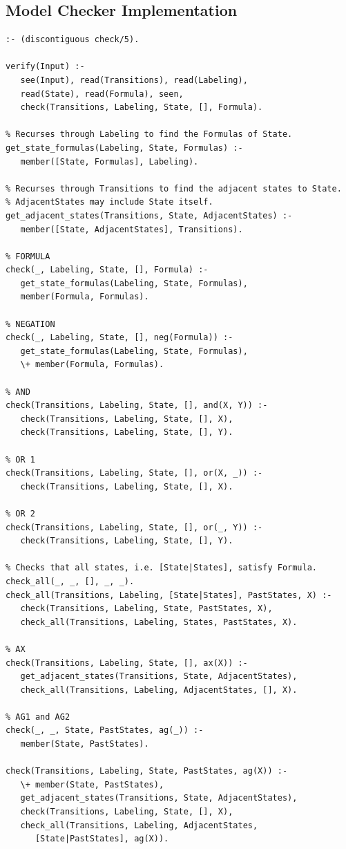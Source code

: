 \documentclass[a4paper, 11pt]{article}
\begin{document}
   \subsection{Model Checker Implementation}

\begin{lstlisting}
:- (discontiguous check/5).

verify(Input) :- 
   see(Input), read(Transitions), read(Labeling),
   read(State), read(Formula), seen,
   check(Transitions, Labeling, State, [], Formula).

% Recurses through Labeling to find the Formulas of State.
get_state_formulas(Labeling, State, Formulas) :-
   member([State, Formulas], Labeling).

% Recurses through Transitions to find the adjacent states to State. 
% AdjacentStates may include State itself.
get_adjacent_states(Transitions, State, AdjacentStates) :-
   member([State, AdjacentStates], Transitions).

% FORMULA
check(_, Labeling, State, [], Formula) :-
   get_state_formulas(Labeling, State, Formulas),
   member(Formula, Formulas).
	
% NEGATION
check(_, Labeling, State, [], neg(Formula)) :-
   get_state_formulas(Labeling, State, Formulas),
   \+ member(Formula, Formulas).
	
% AND
check(Transitions, Labeling, State, [], and(X, Y)) :-
   check(Transitions, Labeling, State, [], X),
   check(Transitions, Labeling, State, [], Y).

% OR 1
check(Transitions, Labeling, State, [], or(X, _)) :-
   check(Transitions, Labeling, State, [], X).

% OR 2
check(Transitions, Labeling, State, [], or(_, Y)) :-
   check(Transitions, Labeling, State, [], Y).

% Checks that all states, i.e. [State|States], satisfy Formula.
check_all(_, _, [], _, _).
check_all(Transitions, Labeling, [State|States], PastStates, X) :-
   check(Transitions, Labeling, State, PastStates, X),
   check_all(Transitions, Labeling, States, PastStates, X).

% AX
check(Transitions, Labeling, State, [], ax(X)) :-
   get_adjacent_states(Transitions, State, AdjacentStates),
   check_all(Transitions, Labeling, AdjacentStates, [], X).

% AG1 and AG2
check(_, _, State, PastStates, ag(_)) :-
   member(State, PastStates).

check(Transitions, Labeling, State, PastStates, ag(X)) :-
   \+ member(State, PastStates),
   get_adjacent_states(Transitions, State, AdjacentStates),
   check(Transitions, Labeling, State, [], X),
   check_all(Transitions, Labeling, AdjacentStates,
      [State|PastStates], ag(X)).


\end{lstlisting}
\end{document}
